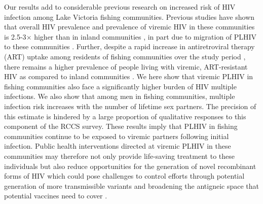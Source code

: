 \documentclass[10pt,letterpaper]{article}
\begin{document}
Our results add to considerable previous research on increased risk of HIV infection among Lake Victoria fishing communities. Previous studies have shown that overall HIV prevalence and prevalence of viremic HIV in these communities is 2.5-3$\times$ higher than in inland communities \cite{chang2016, brizzi2024}, in part due to migration of PLHIV to these communities \cite{grabowski2020,ratmann2020}. Further, despite a rapid increase in antiretroviral therapy (ART) uptake among residents of fishing communities over the study period \cite{kagaayi2019}, there remains a higher prevalence of people living with viremic, ART-resistant HIV as compared to inland communities \cite{martin2023}. We here show that viremic PLHIV in fishing communities also face a significantly higher burden of HIV multiple infections. We also show that among men in fishing communities, multiple infection risk increases with the number of lifetime sex partners. The precision of this estimate is hindered by a large proportion of qualitative responses to this component of the RCCS survey. These results imply that PLHIV in fishing communities continue to be exposed to viremic partners following initial infection. Public health interventions directed at viremic PLHIV in these communities may therefore not only provide life-saving treatment to these individuals but also reduce opportunities for the generation of novel recombinant forms of HIV which could pose challenges to control efforts through potential generation of more transmissible variants and broadening the antigneic space that potential vaccines need to cover \cite{rambaut2004,corey2010, ritchie2014, kiwanuka2009, shriner2004, song2018}. \par
\end{document}
